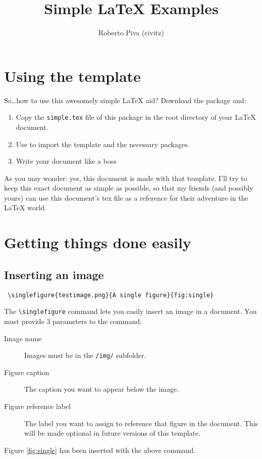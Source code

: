 

\title{Simple \LaTeX{} Examples}
\author{Roberto Piva (civitz)}

\awesomepagelayout



\maketitle

\tableofcontents

\section{Using the template}
So\dots how to use this awesomely simple \LaTeX{} aid? Download the package and:
\begin{enumerate}
 \item Copy the \verb!simple.tex! file of this package in the root directory of your \LaTeX{} document. 
 \item Use \verb!! to import the template and the necessary packages.
 \item Write your document like a boss
\end{enumerate}
As you may wonder: yes, this document is made with that template. 
I'll try to keep this exact document as simple as possible, so that my friends (and possibly yours) 
can use this document's tex file as a reference for their adventure in the \LaTeX{} world.
\section{Getting things done easily}
\label{sec:gtde}
\subsection{Inserting an image}
\begin{verbatim}
 \singlefigure{testimage.png}{A single figure}{fig:single}
\end{verbatim}
The \verb!\singlefigure! command lets you easily insert an image in a document.
You must provide 3 parameters to the command: 
\begin{description}
 \item[Image name] 
    Images must be in the \verb!/img/! subfolder.
 \item[Figure caption] 
    The caption you want to appear below the image.
 \item[Figure reference label] 
    The label you want to assign to reference that figure in the document. 
    This will be made optional in future versions of this template.
\end{description}
Figure \ref{fig:single} has been inserted with the above command.

